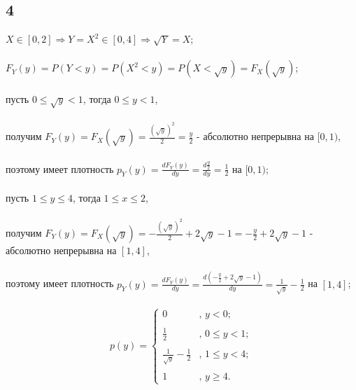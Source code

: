 \documentclass[a4paper]{article}
\begin{document}
\begin{large}
		\subsection*{4}
		$X \in [0,2] \Rightarrow Y=X^2 \in [0, 4] \Rightarrow \sqrt{Y}=X$;\\
		\\
		$F_Y(y)=P(Y<y)=P(X^2<y)=P(X< \sqrt{y})=F_X(\sqrt{y})$;\\
		\\
		пусть $0 \le \sqrt{y}<1$, тогда $0 \le y < 1$,\\
		\\
		получим $F_Y(y)=F_X(\sqrt{y})=\frac{(\sqrt{y})^2}{2}=\frac{y}{2}$ - абсолютно непрерывна на $[0,1)$,\\
		\\
		поэтому имеет плотность $p_Y(y)=\frac{dF_Y(y)}{dy}=\frac{d\frac{y}{2}}{dy}=\frac{1}{2}$ на $[0,1)$;\\
		\\
		пусть $1 \le y \le 4$, тогда $1 \le x \le 2$,\\
		\\
		получим $F_Y(y)=F_X(\sqrt{y})=-\frac{(\sqrt{y})^2}{2}+2\sqrt{y}-1=-\frac{y}{2}+2\sqrt{y}-1$ - абсолютно непрерывна на $[1,4]$,\\
		\\
		поэтому имеет плотность $p_Y(y)=\frac{dF_Y(y)}{dy}=\frac{d(-\frac{y}{2}+2\sqrt{y}-1)}{dy}=\frac{1}{\sqrt{y}}-\frac{1}{2}$ на $[1,4]$;\\
		\\
		\[ p(y) = \left\{ \begin{array}{ll}
			0 & \mbox{, $y<0$};\\
			\\
			\frac{1}{2} & \mbox{, $0\le y<1$};\\
			\\
			\frac{1}{\sqrt{y}}-\frac{1}{2} & \mbox{, $1 \le y < 4$};\\
			\\
			1 & \mbox{, $y \ge 4$}.\end{array} \right. \]
	\end{large}
\end{document}
